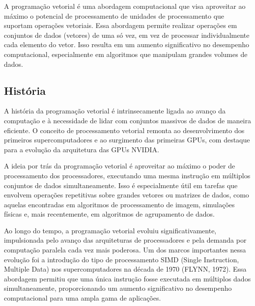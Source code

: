 \documentclass[12pt, %
openright, 
oneside, %
a4paper,    %
brazil]{facom-ufu-abntex2}
\begin{document}



A programação vetorial é uma abordagem computacional que visa aproveitar ao máximo o potencial de processamento de unidades de processamento que suportam operações vetoriais. Essa abordagem permite realizar operações em conjuntos de dados (vetores) de uma só vez, em vez de processar individualmente cada elemento do vetor. Isso resulta em um aumento significativo no desempenho computacional, especialmente em algoritmos que manipulam grandes volumes de dados.



\subsection{História}

A história da programação vetorial é intrinsecamente ligada ao avanço da computação e à necessidade de lidar com conjuntos massivos de dados de maneira eficiente. O conceito de processamento vetorial remonta ao desenvolvimento dos primeiros supercomputadores e ao surgimento das primeiras GPUs, com destaque para a evolução da arquitetura das GPUs NVIDIA.

A ideia por trás da programação vetorial é aproveitar ao máximo o poder de processamento dos processadores, executando uma mesma instrução em múltiplos conjuntos de dados simultaneamente. Isso é especialmente útil em tarefas que envolvem operações repetitivas sobre grandes vetores ou matrizes de dados, como aquelas encontradas em algoritmos de processamento de imagem, simulações físicas e, mais recentemente, em algoritmos de agrupamento de dados.

Ao longo do tempo, a programação vetorial evoluiu significativamente, impulsionada pelo avanço das arquiteturas de processadores e pela demanda por computação paralela cada vez mais poderosa. Um dos marcos importantes nessa evolução foi a introdução do tipo de processamento SIMD (Single Instruction, Multiple Data) nos supercomputadores na década de 1970 (FLYNN, 1972). Essa abordagem permitiu que uma única instrução fosse executada em múltiplos dados simultaneamente, proporcionando um aumento significativo no desempenho computacional para uma ampla gama de aplicações.
\end{document}
